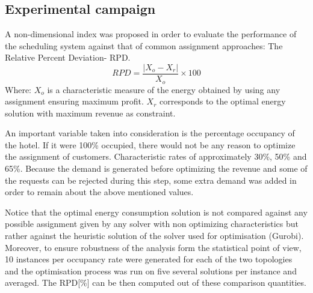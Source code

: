 \subsection{Experimental campaign}
A non-dimensional index was proposed in order to evaluate the performance of the scheduling system against that of common assignment approaches: The Relative Percent Deviation- RPD.
$$RPD = \frac{|X_{o} - X_{r}|}{X_{o}}\times 100$$
Where:
$X_{o}$ is a characteristic measure of the energy obtained by using any assignment ensuring maximum profit.
$X_{r}$ corresponds to the optimal energy solution with maximum revenue as constraint.

An important variable taken into consideration is the percentage occupancy of the hotel. If it were 100\% occupied, there would not be any reason to optimize the assignment of customers. Characteristic rates of approximately 30\%, 50\% and 65\%. Because the demand is generated before optimizing the revenue and some of the requests can be rejected during this step, some extra demand was added in order to remain about the above mentioned values. 

Notice that the optimal energy consumption solution is not compared against any possible assignment given by any solver with non optimizing characteristics but rather against the heuristic solution of the solver used for optimisation (Gurobi). Moreover, to ensure robustness of the analysis form the statistical point of view, 10 instances per occupancy rate were generated for each of the two topologies and the optimisation process was run on five several solutions per instance and averaged. The RPD[\%] can be then computed out of these comparison quantities.



  




